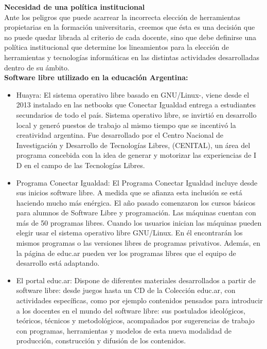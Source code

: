 {\bf Necesidad de una política institucional} \\

Ante los peligros que puede acarrear la incorrecta elección de herramientas propietarias en la formación universitaria, creemos que ésta es una decisión que no puede quedar librada al criterio de cada docente, sino que debe definirse una política institucional que determine los lineamientos para la elección de herramientas y tecnologías informáticas en las distintas actividades desarrolladas dentro de su ámbito.\\

{\bf Software libre utilizado en la educación Argentina:}
\begin{itemize}
\item Huayra: El sistema operativo libre basado en GNU/Linux-, viene desde el 2013 instalado en las netbooks que Conectar Igualdad entrega a estudiantes secundarios de todo el país. Sistema operativo libre, se invirtió en desarrollo local y generó puestos de trabajo al mismo tiempo que se incentivó la creatividad argentina. Fue desarrollado por el Centro Nacional de Investigación y Desarrollo de Tecnologías Libres, (CENITAL), un área del programa concebida con la idea de generar y motorizar las experiencias de I D en el campo de las Tecnologías Libres.
\item Programa Conectar Igualdad: El Programa Conectar Igualdad incluye desde sus inicios software libre. A medida que se afianza esta inclusión se está haciendo mucho más enérgica. El año pasado comenzaron los cursos básicos para alumnos de Software Libre y programación. Las máquinas cuentan con más de 50 programas libres. Cuando los usuarios inician las máquinas pueden elegir usar el sistema operativo libre GNU/Linux. En él encontrarán los mismos programas o las versiones libres de programas privativos. Además, en la página de educ.ar pueden ver los programas libres que el equipo de desarrollo está adaptando.
\item El portal educ.ar: Dispone de diferentes materiales desarrollados a partir de software libre: desde juegos hasta un CD de la Colección educ.ar, con actividades específicas, como por ejemplo contenidos pensados para introducir a los docentes en el mundo del software libre: sus postulados ideológicos, teóricos, técnicos y metodológicos, acompañados por sugerencias de trabajo con programas, herramientas y modelos de esta nueva modalidad de producción, construcción y difusión de los contenidos.
\end{itemize}

